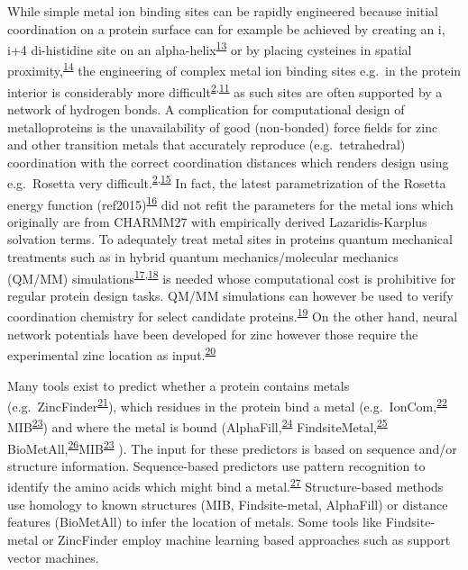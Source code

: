 \documentclass[ lineno,
  9pt]{elife}
\begin{document}
While simple metal ion binding sites can be rapidly engineered because initial coordination on a protein surface can for example be achieved by creating an i, i+4 di-histidine site on an alpha-helix\textsuperscript{\protect\hyperlink{ref-io987fKE}{13}} or by placing cysteines in spatial proximity,\textsuperscript{\protect\hyperlink{ref-JXKFLH3I}{14}} the engineering of complex metal ion binding sites e.g.~in the protein interior is considerably more difficult\textsuperscript{\protect\hyperlink{ref-LY9UGI7}{2},\protect\hyperlink{ref-Lj2sbjzc}{11}} as such sites are often supported by a network of hydrogen bonds. A complication for computational design of metalloproteins is the unavailability of good (non-bonded) force fields for zinc and other transition metals that accurately reproduce (e.g.~tetrahedral) coordination with the correct coordination distances which renders design using e.g.~Rosetta very difficult.\textsuperscript{\protect\hyperlink{ref-LY9UGI7}{2},\protect\hyperlink{ref-1FR3e6DyA}{15}} In fact, the latest parametrization of the Rosetta energy function (ref2015)\textsuperscript{\protect\hyperlink{ref-1uPiiMnD}{16}} did not refit the parameters for the metal ions which originally are from CHARMM27 with empirically derived Lazaridis-Karplus solvation terms. To adequately treat metal sites in proteins quantum mechanical treatments such as in hybrid quantum mechanics/molecular mechanics (QM/MM) simulations\textsuperscript{\protect\hyperlink{ref-5Vxh8hay}{17},\protect\hyperlink{ref-IXq7vmo3}{18}} is needed whose computational cost is prohibitive for regular protein design tasks. QM/MM simulations can however be used to verify coordination chemistry for select candidate proteins.\textsuperscript{\protect\hyperlink{ref-nlfa683y}{19}} On the other hand, neural network potentials have been developed for zinc however those require the experimental zinc location as input.\textsuperscript{\protect\hyperlink{ref-b5EJeHX3}{20}}

Many tools exist to predict whether a protein contains metals (e.g.~ZincFinder\textsuperscript{\protect\hyperlink{ref-qNdK0F1w}{21}}), which residues in the protein bind a metal (e.g.~IonCom,\textsuperscript{\protect\hyperlink{ref-KNmKWbrP}{22}} MIB\textsuperscript{\protect\hyperlink{ref-1HMhB3vxM}{23}}) and where the metal is bound (AlphaFill,\textsuperscript{\protect\hyperlink{ref-13fLqNwbD}{24}} FindsiteMetal,\textsuperscript{\protect\hyperlink{ref-W4f7UG1p}{25}} BioMetAll,\textsuperscript{\protect\hyperlink{ref-iHxzzTCG}{26}}MIB\textsuperscript{\protect\hyperlink{ref-1HMhB3vxM}{23}} ). The input for these predictors is based on sequence and/or structure information. Sequence-based predictors use pattern recognition to identify the amino acids which might bind a metal.\textsuperscript{\protect\hyperlink{ref-13sNVOrHB}{27}}
Structure-based methods use homology to known structures (MIB, Findsite-metal, AlphaFill) or distance features (BioMetAll) to infer the location of metals. Some tools like Findsite-metal or ZincFinder employ machine learning based approaches such as support vector machines.
\end{document}

